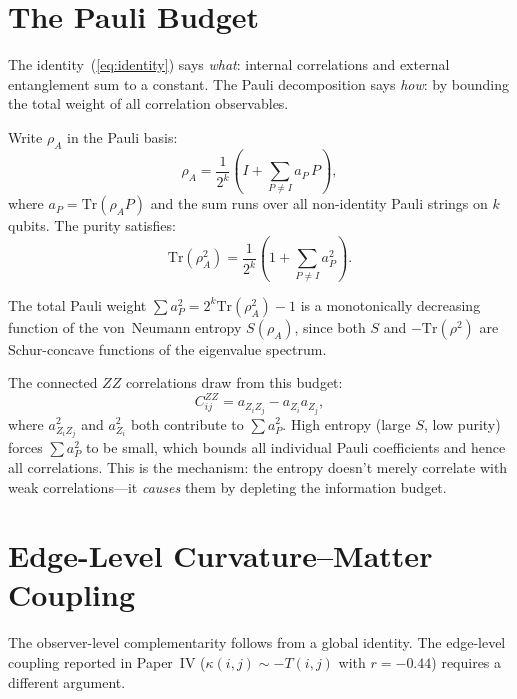 \documentclass[aps,pra,twocolumn,superscriptaddress,floatfix]{revtex4-2}
\begin{document}
\section{The Pauli Budget}
\label{sec:pauli}

The identity~(\ref{eq:identity}) says \textit{what}:
internal correlations and external entanglement sum
to a constant.  The Pauli decomposition says \textit{how}:
by bounding the total weight of all correlation
observables.

Write $\rho_A$ in the Pauli basis:
\begin{equation}
\rho_A = \frac{1}{2^k}\left(I
+ \sum_{P \neq I} a_P \, P\right),
\label{eq:pauli}
\end{equation}
where $a_P = \mathrm{Tr}(\rho_A P)$ and the sum runs
over all non-identity Pauli strings on $k$ qubits.
The purity satisfies:
\begin{equation}
\mathrm{Tr}(\rho_A^2) = \frac{1}{2^k}
\left(1 + \sum_{P \neq I} a_P^2\right).
\label{eq:purity}
\end{equation}

The total Pauli weight $\sum a_P^2 = 2^k \mathrm{Tr}(\rho_A^2) - 1$
is a monotonically decreasing function of the
von~Neumann entropy $S(\rho_A)$, since both $S$
and $-\mathrm{Tr}(\rho^2)$ are Schur-concave functions
of the eigenvalue spectrum.

The connected $ZZ$ correlations draw from this budget:
\begin{equation}
C_{ij}^{ZZ} = a_{Z_iZ_j} - a_{Z_i} a_{Z_j},
\end{equation}
where $a_{Z_iZ_j}^2$ and $a_{Z_i}^2$ both contribute
to $\sum a_P^2$.  High entropy
(large $S$, low purity) forces $\sum a_P^2$ to be small,
which bounds all individual Pauli coefficients and hence
all correlations.  This is the mechanism: the entropy
doesn't merely correlate with weak correlations---it
\textit{causes} them by depleting the information budget.


\section{Edge-Level Curvature--Matter Coupling}
\label{sec:edge}

The observer-level complementarity follows from a global
identity.  The edge-level coupling reported in Paper~IV
($\kappa(i,j) \sim -T(i,j)$ with $r = -0.44$) requires
a different argument.
\end{document}
